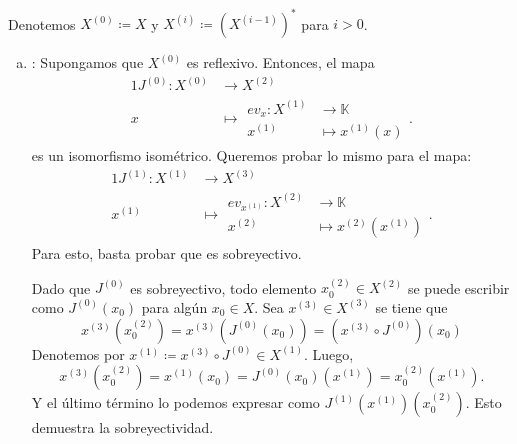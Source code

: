 \documentclass[11pt]{article}
\newenvironment{Solucion}[1][]
{%
  \newline
	\noindent{\ttfamily SOLUCIÓN}~
}%
{%
}
\newcommand{\K}{\mathbb{K}}
\begin{document}
\begin{Solucion}
  Denotemos \(X^{(0)} \coloneqq X\) y \(X^{(i)} \coloneqq (X^{(i-1)})^{\ast}\) para \(i>0\).   
  \begin{enumerate}[(a)]
    \item 
    \framebox{\(\implies\)}: Supongamos que \(X^{(0)}\) es reflexivo. Entonces, el mapa
    \begin{alignat*}{1}
      J^{(0)} \colon X^{(0)} &\to X^{(2)}\\
      x &\mapsto 
      \begin{aligned}
        ev_{x} \colon X^{(1)} &\to \K\\
        x^{(1)} &\mapsto x^{(1)}(x)
      \end{aligned}.
    \end{alignat*}
  es un isomorfismo isométrico. Queremos probar lo mismo para el mapa:
  \begin{alignat*}{1}
    J^{(1)} \colon X^{(1)} &\to X^{(3)}\\
    x^{(1)} &\mapsto
    \begin{aligned}
      ev_{x^{(1)}} \colon X^{(2)} &\to \K\\
      x^{(2)} &\mapsto x^{(2)}(x^{(1)}) 
    \end{aligned}.
  \end{alignat*}
  Para esto, basta probar que es sobreyectivo. 

  Dado que \(J^{(0)}\) es sobreyectivo, todo elemento \(x_0^{(2)} \in X^{(2)}\) se
  puede escribir como \(J^{(0)}(x_0)\) para algún \(x_0 \in X\).
  Sea \(x^{(3)} \in X^{(3)}\) se tiene que 
  \begin{displaymath}
    x^{(3)}(x_0^{(2)})
    = x^{(3)} ( J^{(0)}(x_0) )
    = (x^{(3)}\circ J^{(0)}) (x_0)
  \end{displaymath}
  Denotemos por \(x^{(1)} \coloneqq x^{(3)} \circ J^{(0)} \in X^{(1)}\). Luego,
  \begin{displaymath}
    x^{(3)}(x_0^{(2)}) = x^{(1)}(x_0) = J^{(0)}(x_0)(x^{(1)}) = x_0^{(2)}(x^{(1)}).
  \end{displaymath}
  Y el último término lo podemos expresar como \(J^{(1)}(x^{(1)})(x_0^{(2)})\).
  Esto demuestra la sobreyectividad.


\end{enumerate}
\end{Solucion}
\end{document}
